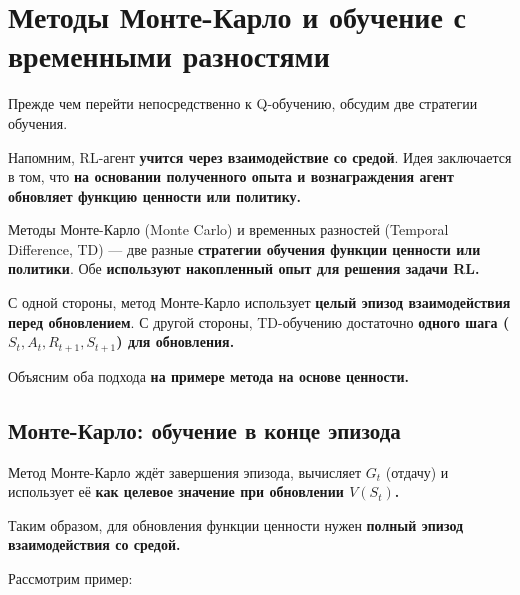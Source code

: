 \documentclass[11pt,a4paper]{article}
\begin{document}
\section{Методы Монте-Карло и обучение с временными разностями}\label{monte-carlo-vs-temporal-difference-learning}

Прежде чем перейти непосредственно к Q-обучению, обсудим две стратегии обучения.

Напомним, RL-агент \textbf{учится через взаимодействие со средой}. Идея заключается в том, что \textbf{на основании полученного опыта и вознаграждения агент обновляет функцию ценности или политику.}

Методы Монте-Карло (Monte Carlo) и временных разностей (Temporal Difference, TD) --- две разные \textbf{стратегии обучения функции ценности или политики}. Обе \textbf{используют накопленный опыт для решения задачи RL.}

С одной стороны, метод Монте-Карло использует \textbf{целый эпизод взаимодействия перед обновлением}. С другой стороны, TD-обучению достаточно \textbf{одного шага (\(S_t,A_t,R_{t+1},S_{t+1}\)) для обновления.}

Объясним оба подхода \textbf{на примере метода на основе ценности.}

\subsection{Монте-Карло: обучение в конце эпизода}\label{monte-carlo-learning-at-the-end-of-the-episode}

Метод Монте-Карло ждёт завершения эпизода, вычисляет \(G_t\) (отдачу) и использует её \textbf{как целевое значение при обновлении \(V(S_t)\).}

Таким образом, для обновления функции ценности нужен \textbf{полный эпизод взаимодействия со средой.}


Рассмотрим пример:

\end{document}
